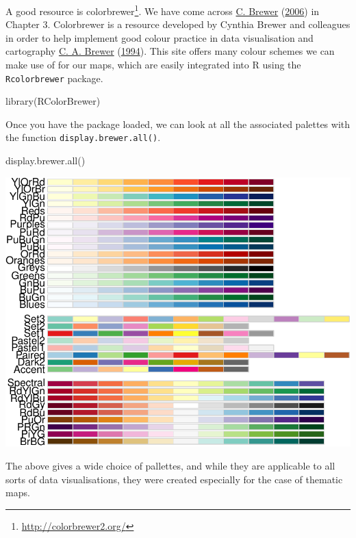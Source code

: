 \documentclass[
]{book}
\makeatletter
\newenvironment{Shaded}{\begin{snugshade}}{\end{snugshade}}
\newcommand{\FunctionTok}[1]{\textcolor[rgb]{0,0,0}{#1}}
\newcommand{\NormalTok}[1]{#1}
\renewcommand{\href}[2]{#2\footnote{\url{#1}}}
\newenvironment{kframe}{%
\medskip{}
\setlength{\fboxsep}{.8em}
 \def\at@end@of@kframe{}%
 \ifinner\ifhmode%
  \def\at@end@of@kframe{\end{minipage}}%
  \begin{minipage}{\columnwidth}%
 \fi\fi%
 \def\FrameCommand##1{\hskip\@totalleftmargin \hskip-\fboxsep
 \colorbox{shadecolor}{##1}\hskip-\fboxsep
     \hskip-\linewidth \hskip-\@totalleftmargin \hskip\columnwidth}%
 \MakeFramed {\advance\hsize-\width
   \@totalleftmargin\z@ \linewidth\hsize
   \@setminipage}}%
 {\par\unskip\endMakeFramed%
 \at@end@of@kframe}
\renewenvironment{Shaded}{\begin{kframe}}{\end{kframe}}
\makeatother
\begin{document}
A good resource is \href{http://colorbrewer2.org/}{colorbrewer}. We have come across \protect\hyperlink{ref-Brewer_2006}{C. Brewer} (\protect\hyperlink{ref-Brewer_2006}{2006}) in Chapter 3. Colorbrewer is a resource developed by Cynthia Brewer and colleagues in order to help implement good colour practice in data visualisation and cartography \protect\hyperlink{ref-Brewer_1994}{C. A. Brewer} (\protect\hyperlink{ref-Brewer_1994}{1994}). This site offers many colour schemes we can make use of for our maps, which are easily integrated into R using the \texttt{Rcolorbrewer} package.

\begin{Shaded}
\begin{Highlighting}[]
\FunctionTok{library}\NormalTok{(RColorBrewer)}
\end{Highlighting}
\end{Shaded}

Once you have the package loaded, we can look at all the associated palettes with the function \texttt{display.brewer.all()}.

\begin{Shaded}
\begin{Highlighting}[]
\FunctionTok{display.brewer.all}\NormalTok{()}
\end{Highlighting}
\end{Shaded}

\includegraphics{crime_mapping_files/figure-latex/dsplayallcolourbrewerpallettes-1.pdf}

The above gives a wide choice of pallettes, and while they are applicable to all sorts of data visualisations, they were created especially for the case of thematic maps.
\end{document}

